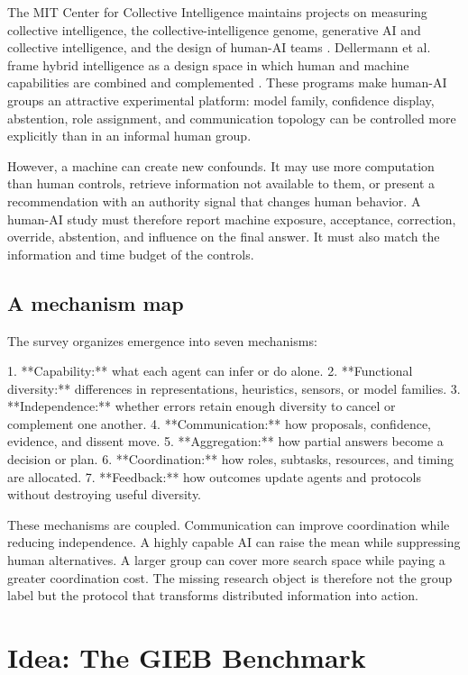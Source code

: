 \documentclass[conference]{IEEEtran}
\begin{document}
The MIT Center for Collective Intelligence maintains projects on measuring collective intelligence, the collective-intelligence genome, generative AI and collective intelligence, and the design of human-AI teams \cite{mitcci}. Dellermann et al. frame hybrid intelligence as a design space in which human and machine capabilities are combined and complemented \cite{dellermann2019}. These programs make human-AI groups an attractive experimental platform: model family, confidence display, abstention, role assignment, and communication topology can be controlled more explicitly than in an informal human group.

However, a machine can create new confounds. It may use more computation than human controls, retrieve information not available to them, or present a recommendation with an authority signal that changes human behavior. A human-AI study must therefore report machine exposure, acceptance, correction, override, abstention, and influence on the final answer. It must also match the information and time budget of the controls.

\subsection{A mechanism map}

The survey organizes emergence into seven mechanisms:

1. **Capability:** what each agent can infer or do alone.
2. **Functional diversity:** differences in representations, heuristics, sensors, or model families.
3. **Independence:** whether errors retain enough diversity to cancel or complement one another.
4. **Communication:** how proposals, confidence, evidence, and dissent move.
5. **Aggregation:** how partial answers become a decision or plan.
6. **Coordination:** how roles, subtasks, resources, and timing are allocated.
7. **Feedback:** how outcomes update agents and protocols without destroying useful diversity.

These mechanisms are coupled. Communication can improve coordination while reducing independence. A highly capable AI can raise the mean while suppressing human alternatives. A larger group can cover more search space while paying a greater coordination cost. The missing research object is therefore not the group label but the protocol that transforms distributed information into action.

\section{Idea: The GIEB Benchmark}
\end{document}
